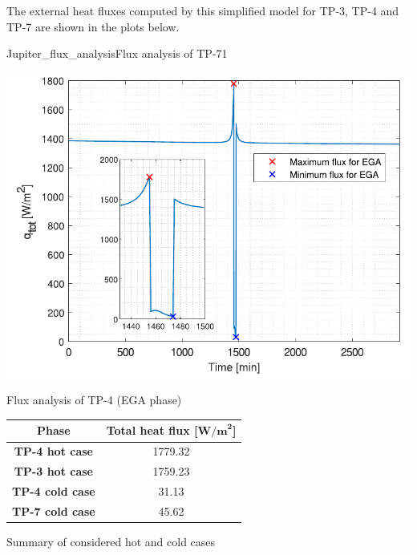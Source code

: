 The external heat fluxes computed by this simplified model for TP-3, TP-4 and TP-7 are shown in the plots below.

    {Jupiter_flux_analysis}{Flux analysis of TP-7}{1}

\begin{minipage}{0.5\linewidth}
    \centering
    \captionsetup{type=figure}
    \includegraphics[width=\linewidth]{Images/EGA_flux_analysis.pdf}
    \caption{Flux analysis of TP-4 (EGA phase)}
    \label{fig:EGA_flux_analysis}
\end{minipage}\hfill
\begin{minipage}{0.5\linewidth}
    \centering
    \captionsetup{type=table}
    \renewcommand{\arraystretch}{1.4}
    \begin{tabular}{|c|c|}
        \hline
        \textbf{Phase} &
        \textbf{Total heat flux [$\boldsymbol{\textbf{W/m}^2}$]} \\
        \hline
        \hline
        \textbf{TP-4 hot case}      & 1779.32   \\
        \hline
        \textbf{TP-3 hot case}      & 1759.23   \\
        \hline
        \hline
        \textbf{TP-4 cold case}     & 31.13     \\
        \hline
        \textbf{TP-7 cold case}     & 45.62     \\
        \hline
    \end{tabular}
    \caption{Summary of considered hot and cold cases}
    \label{table:cases}
\end{minipage}

